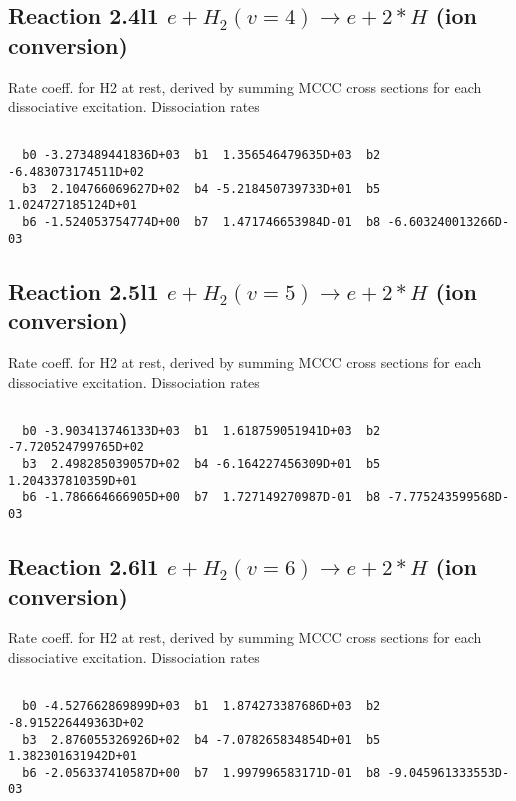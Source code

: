 \newpage
\subsection{
Reaction 2.4l1
$ e + H_2(v=4) \rightarrow e + 2*H $ (ion conversion)
}
Rate coeff. for H2 at rest, derived by summing MCCC cross sections for each dissociative excitation.
Dissociation rates 

\begin{small}\begin{verbatim}

  b0 -3.273489441836D+03  b1  1.356546479635D+03  b2 -6.483073174511D+02
  b3  2.104766069627D+02  b4 -5.218450739733D+01  b5  1.024727185124D+01
  b6 -1.524053754774D+00  b7  1.471746653984D-01  b8 -6.603240013266D-03

\end{verbatim}\end{small}

\newpage
\subsection{
Reaction 2.5l1
$ e + H_2(v=5) \rightarrow e + 2*H $ (ion conversion)
}
Rate coeff. for H2 at rest, derived by summing MCCC cross sections for each dissociative excitation.
Dissociation rates 

\begin{small}\begin{verbatim}

  b0 -3.903413746133D+03  b1  1.618759051941D+03  b2 -7.720524799765D+02
  b3  2.498285039057D+02  b4 -6.164227456309D+01  b5  1.204337810359D+01
  b6 -1.786664666905D+00  b7  1.727149270987D-01  b8 -7.775243599568D-03

\end{verbatim}\end{small}

\newpage
\subsection{
Reaction 2.6l1
$ e + H_2(v=6) \rightarrow e + 2*H $ (ion conversion)
}
Rate coeff. for H2 at rest, derived by summing MCCC cross sections for each dissociative excitation.
Dissociation rates 

\begin{small}\begin{verbatim}

  b0 -4.527662869899D+03  b1  1.874273387686D+03  b2 -8.915226449363D+02
  b3  2.876055326926D+02  b4 -7.078265834854D+01  b5  1.382301631942D+01
  b6 -2.056337410587D+00  b7  1.997996583171D-01  b8 -9.045961333553D-03

\end{verbatim}\end{small}

